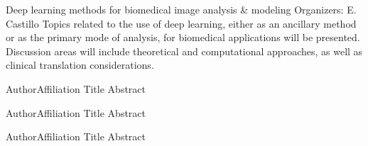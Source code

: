 \label{mini05}

\miniabs
{Deep learning methods for biomedical image analysis \& modeling}
{Organizers: E. Castillo}
{Topics related to the use of deep learning, either as an ancillary method or as the primary mode of analysis, for biomedical applications will be presented. Discussion areas will include theoretical and computational approaches, as well as clinical translation considerations.}
\vspace{2ex}



\abs
{Author}{Affiliation}
{Title}
{Abstract
}

\vspace{1.5ex}

\abs
{Author}{Affiliation}
{Title}
{Abstract
}

\vspace{1.5ex}

\abs
{Author}{Affiliation}
{Title}
{Abstract
}
